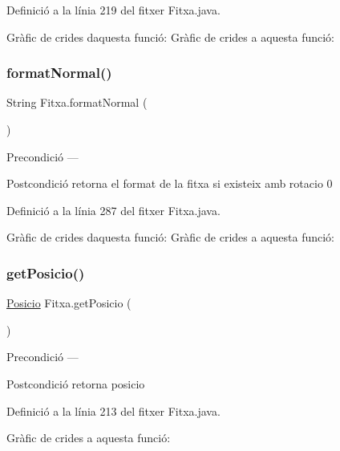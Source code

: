 Definició a la línia 219 del fitxer Fitxa.\+java.

Gràfic de crides d\textquotesingle{}aquesta funció\+:
Gràfic de crides a aquesta funció\+:
\mbox{\label{class_fitxa_af6e05ee97e95b46e754d73d4e6fd8d8c}} 
\subsubsection{\texorpdfstring{format\+Normal()}{formatNormal()}}
{\footnotesize\ttfamily String Fitxa.\+format\+Normal (\begin{DoxyParamCaption}{ }\end{DoxyParamCaption})}

\begin{DoxyPrecond}{Precondició}
--- 
\end{DoxyPrecond}
\begin{DoxyPostcond}{Postcondició}
retorna el format de la fitxa si existeix amb rotacio 0 
\end{DoxyPostcond}


Definició a la línia 287 del fitxer Fitxa.\+java.

Gràfic de crides d\textquotesingle{}aquesta funció\+:
Gràfic de crides a aquesta funció\+:
\mbox{\label{class_fitxa_a9f8c54c9bd9dce77ecd4fd47c58687d3}} 
\subsubsection{\texorpdfstring{get\+Posicio()}{getPosicio()}}
{\footnotesize\ttfamily \mbox{\hyperlink{class_posicio}{Posicio}} Fitxa.\+get\+Posicio (\begin{DoxyParamCaption}{ }\end{DoxyParamCaption})}

\begin{DoxyPrecond}{Precondició}
--- 
\end{DoxyPrecond}
\begin{DoxyPostcond}{Postcondició}
retorna posicio 
\end{DoxyPostcond}


Definició a la línia 213 del fitxer Fitxa.\+java.

Gràfic de crides a aquesta funció\+:
\mbox{\label{class_fitxa_a408b3191cfdbde147edea3ec0254c44d}} 
